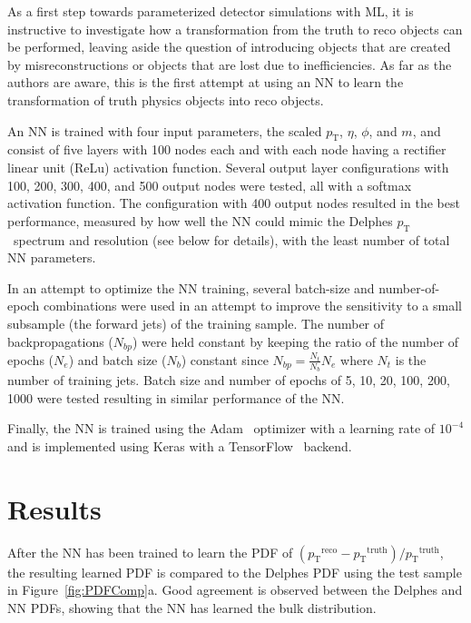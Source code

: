 \documentclass[showpacs,showkeys,preprint,prd,nofootinbib,linenumbers,12pt,superscriptaddress]{revtex4-1}
\def\pt{\ensuremath{p_{\mathrm{T}}}}
\def\ptRes{\ensuremath{(\pt^{\mathrm{reco}}-\pt^{\mathrm{truth}})/\pt^{\mathrm{truth}}}}
\begin{document}
As a first step towards parameterized detector simulations with ML, it is instructive to investigate how a transformation from the truth to reco objects can be performed, leaving aside the question of introducing objects that are created by misreconstructions or objects that are lost due to inefficiencies. As far as the authors are aware, this is the first attempt at using an NN to learn the transformation of truth physics objects into reco objects.

An NN is trained with four input parameters, the scaled \pt, $\eta$, $\phi$, and $m$, and consist of five layers with 100 nodes each and with each node having a rectifier linear unit (ReLu) activation function. Several output layer configurations with 100, 200, 300, 400, and 500 output nodes were tested, all with a softmax activation function. The configuration with 400 output nodes resulted in the best performance, measured by how well the NN could mimic the Delphes \pt\ spectrum and resolution (see below for details), with the least number of total NN parameters. 

In an attempt to optimize the NN training, several batch-size and number-of-epoch combinations were used in an attempt to improve the sensitivity to a small subsample (the forward jets) of the training sample. The number of backpropagations ($N_{bp}$) were held constant by keeping the ratio of the number of epochs ($N_e$) and batch size ($N_b$) constant since $N_{bp}=\frac{N_t}{N_b}N_e$ where $N_t$ is the number of training jets. Batch size and number of epochs of 5, 10, 20, 100, 200, 1000 were tested resulting in similar performance of the NN.

Finally, the NN is trained using the Adam~\cite{adam} optimizer with a learning rate of $10^{-4}$ and is implemented using Keras with a TensorFlow~\cite{tensorflow2015-whitepaper} backend.

\FloatBarrier
\section{Results}
\label{sec:results}

After the NN has been trained to learn the PDF of \ptRes, the resulting learned PDF is compared to the Delphes PDF using the test sample in Figure~\ref{fig:PDFComp}a. Good agreement is observed between the Delphes and NN PDFs, showing that the NN has learned the bulk distribution.
\end{document}
